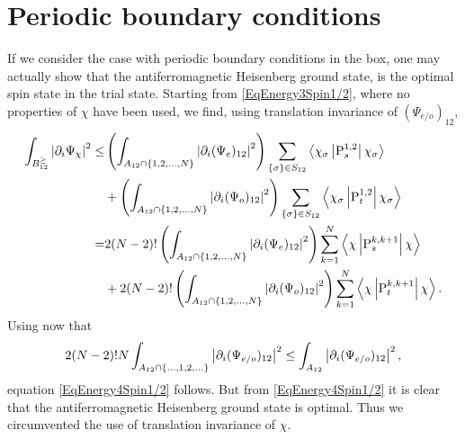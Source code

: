 \chapter{Periodic boundary conditions}
\label{AppendixPeriodicBCSpin1/2}
If we consider the case with periodic boundary conditions in the box, one may actually show that the antiferromagnetic Heisenberg ground state, is the optimal spin state in the trial state. Starting from \eqref{EqEnergy3Spin1/2}, where no properties of $ \chi $ have been used, we find, using translation invariance of $ (\Psi_{e/o})_{12} $,
\begin{equation}\label{EqPeriodicUpperBound1}
\begin{aligned}
\int_{B_{12}^{\geq}}\left\lvert \partial_i\Psi_{\chi} \right\rvert^2\leq&\left(\int_{A_{12}\cap\{1,2,\ldots,N\}}\left\lvert \partial_i(\Psi_e)_{12} \right\rvert^2\right)\sum_{\{\sigma\}\in S_{12}}\left\langle\chi_{\sigma} \left\lvert \operatorname{P}^{1,2}_s  \right\rvert \chi_\sigma\right\rangle\\
&+\left(\int_{A_{12}\cap \{1,2,\ldots,N\}}\left\lvert \partial_i(\Psi_o)_{12} \right\rvert^2\right)\sum_{\{\sigma\}\in S_{12}}\left\langle\chi_{\sigma} \left\lvert \operatorname{P}^{1,2}_t  \right\rvert \chi_\sigma\right\rangle\\
=&2(N-2)!\left(\int_{A_{12}\cap\{1,2,\ldots,N\}}\left\lvert \partial_i(\Psi_e)_{12} \right\rvert^2\right)\sum_{k=1}^{N}\left\langle\chi \left\lvert \operatorname{P}^{k,k+1}_s  \right\rvert \chi\right\rangle\\
&+2(N-2)!\left(\int_{A_{12}\cap \{1,2,\ldots,N\}}\left\lvert \partial_i(\Psi_o)_{12} \right\rvert^2\right)\sum_{k=1}^{N}\left\langle\chi \left\lvert \operatorname{P}^{k,k+1}_t  \right\rvert \chi\right\rangle.
\end{aligned}
\end{equation}
Using now that \begin{equation}
2(N-2)!N\int_{A_{12}\cap \{\ldots,1,2,\ldots\}}\left\lvert \partial_i(\Psi_{e/o})_{12} \right\rvert^2\leq \int_{A_{12}}\left\lvert \partial_i(\Psi_{e/o})_{12} \right\rvert^2,
\end{equation}
equation \eqref{EqEnergy4Spin1/2} follows.
But from \eqref{EqEnergy4Spin1/2} it is clear that the antiferromagnetic Heisenberg ground state is optimal. Thus we circumvented the use of translation invariance of $ \chi $.



